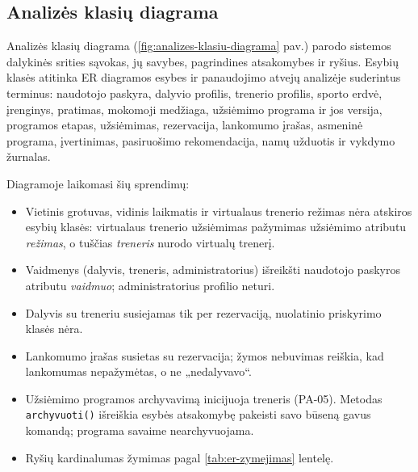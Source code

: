 
\subsection{Analizės klasių diagrama}
\label{sec:analizes-klasiu-diagrama}

Analizės klasių diagrama (\ref{fig:analizes-klasiu-diagrama} pav.) parodo sistemos
dalykinės srities sąvokas, jų savybes, pagrindines atsakomybes ir ryšius. Esybių klasės
atitinka ER diagramos esybes ir panaudojimo atvejų
analizėje suderintus terminus: naudotojo paskyra, dalyvio profilis, trenerio profilis,
sporto erdvė, įrenginys, pratimas, mokomoji medžiaga, užsiėmimo programa ir jos versija,
programos etapas, užsiėmimas, rezervacija, lankomumo įrašas, asmeninė programa,
įvertinimas, pasiruošimo rekomendacija, namų užduotis ir vykdymo žurnalas.

Diagramoje laikomasi šių sprendimų:
\begin{itemize}
  \item Vietinis grotuvas, vidinis laikmatis ir virtualaus trenerio režimas nėra atskiros
        esybių klasės: virtualaus trenerio užsiėmimas pažymimas užsiėmimo atributu
        \emph{režimas}, o tuščias \emph{treneris} nurodo virtualų trenerį.
  \item Vaidmenys (dalyvis, treneris, administratorius) išreikšti naudotojo paskyros
        atributu \emph{vaidmuo}; administratorius profilio neturi.
  \item Dalyvis su treneriu susiejamas tik per rezervaciją, nuolatinio priskyrimo
        klasės nėra.
  \item Lankomumo įrašas susietas su rezervacija; žymos nebuvimas reiškia, kad
        lankomumas nepažymėtas, o ne „nedalyvavo“.
  \item Užsiėmimo programos archyvavimą inicijuoja treneris (PA-05).
        Metodas \texttt{archyvuoti()} išreiškia esybės atsakomybę pakeisti savo
        būseną gavus komandą; programa savaime nearchyvuojama.
  \item Ryšių kardinalumas žymimas pagal \ref{tab:er-zymejimas} lentelę.
\end{itemize}

